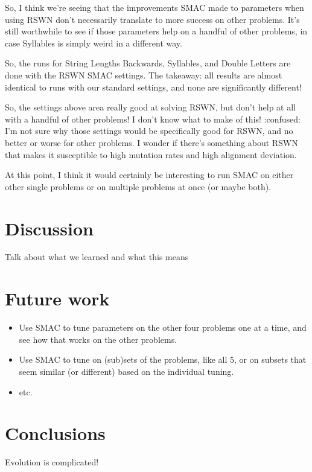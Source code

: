 \documentclass{llncs}
\begin{document}
So, I think we're seeing that the improvements SMAC made to parameters when using RSWN don't necessarily translate to more success on other problems. It's still worthwhile to see if those parameters help on a handful of other problems, in case Syllables is simply weird in a different way.

So, the runs for String Lengths Backwards, Syllables, and Double Letters are done with the RSWN SMAC settings. The takeaway: all results are almost identical to runs with our standard settings, and none are significantly different!

So, the settings above area really good at solving RSWN, but don't help at all with a handful of other problems! I don't know what to make of this! :confused: I'm not sure why those settings would be specifically good for RSWN, and no better or worse for other problems. I wonder if there's something about RSWN that makes it susceptible to high mutation rates and high alignment deviation.

At this point, I think it would certainly be interesting to run SMAC on either other single problems or on multiple problems at once (or maybe both).

\section{Discussion}

Talk about what we learned and what this means

\section{Future work}

\begin{itemize}
	\item Use SMAC to tune parameters on the other four problems one at a time, and see how that works on the other problems.
	\item Use SMAC to tune on (sub)sets of the problems, like all 5, or on subsets that seem similar (or different) based on the individual tuning.
	\item etc.
\end{itemize}

\section{Conclusions}

Evolution is complicated!
\end{document}

